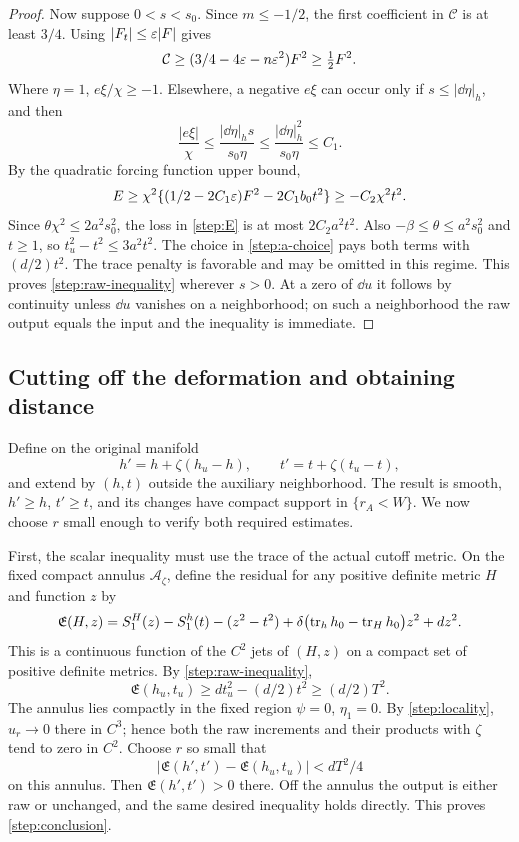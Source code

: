 \begin{proof}
Now suppose $0<s<s_0$.  Since $m\le-1/2$, the first coefficient in
$\mathcal C$ is at least $3/4$.  Using $|F_t|\le\varepsilon|F|$ gives
\[
 \mathcal C\ge(3/4-4\varepsilon-n\varepsilon^2)F^2\ge\tfrac12F^2.
\]
Where $\eta=1$, $e\xi/\chi\ge-1$.  Elsewhere, a negative $e\xi$
can occur only if $s\le|\dd\eta|_h$, and then
\[
 \frac{|e\xi|}{\chi}
 \le\frac{|\dd\eta|_h s}{s_0\eta}
 \le\frac{|\dd\eta|_h^2}{s_0\eta}\le C_1.
\]
By the quadratic forcing function upper bound,
\begin{equation}\label{step:small-slope}
 E\ge\chi^2\{(1/2-2C_1\varepsilon)F^2-2C_1b_0t^2\}
 \ge-C_2\chi^2t^2.
\end{equation}
Since $\theta\chi^2\le2a^2s_0^2$, the loss in \cref{step:E} is
at most $2C_2a^2t^2$.  Also $-\beta\le\theta\le a^2s_0^2$ and
$t\ge1$, so $t_u^2-t^2\le3a^2t^2$.  The choice in
\cref{step:a-choice} pays both terms with $(d/2)t^2$.
The trace penalty is favorable and may be omitted in this regime.
This proves \cref{step:raw-inequality} wherever $s>0$.
At a zero of $\dd u$ it follows by continuity unless $\dd u$ vanishes
on a neighborhood; on such a neighborhood the raw output equals the
input and the inequality is immediate.
\end{proof}

\subsection{Cutting off the deformation and obtaining distance}\label{step:completion}

Define on the original manifold
\begin{equation}\label{step:final-output}
 h'=h+\zeta(h_u-h),\qquad t'=t+\zeta(t_u-t),
\end{equation}
and extend by $(h,t)$ outside the auxiliary neighborhood.  The result
is smooth, $h'\ge h$, $t'\ge t$, and its changes have compact support
in $\{r_A<W\}$.  We now choose $r$ small enough to verify both
required estimates.

First, the scalar inequality must use the trace of the actual cutoff
metric.  On the fixed compact annulus $\mathcal A_\zeta$, define the residual for any positive definite metric $H$
and function $z$ by
\[
 \mathfrak E(H,z)=S^{H}_1(z)-S^{h}_1(t)-(z^2-t^2)
 +\delta\bigl(\operatorname{tr}_hh_0-\operatorname{tr}_Hh_0\bigr)z^2+dz^2.
\]
This is a continuous function of the $C^2$ jets of $(H,z)$ on a compact
set of positive definite metrics.  By \cref{step:raw-inequality},
\[
 \mathfrak E(h_u,t_u)\ge dt_u^2-(d/2)t^2\ge(d/2)T^2.
\]
The annulus lies compactly in the fixed region $\psi=0$, $\eta_1=0$.
By \cref{step:locality}, $u_r\to0$ there in $C^3$; hence both the raw
increments and their products with $\zeta$ tend to zero in $C^2$.
Choose $r$ so small that
\[
 |\mathfrak E(h',t')-\mathfrak E(h_u,t_u)|<dT^2/4
\]
on this annulus.  Then $\mathfrak E(h',t')>0$ there.  Off the annulus
the output is either raw or unchanged, and the same desired inequality
holds directly. This proves \cref{step:conclusion}.

